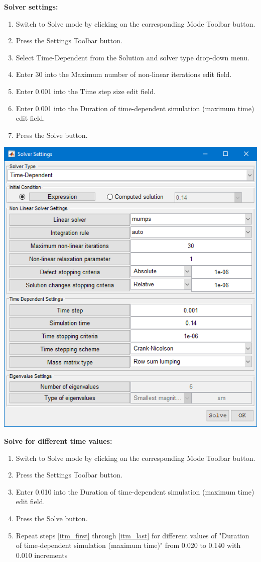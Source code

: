 \documentclass{article}
\begin{document}
\textbf{Solver settings:}
\begin{enumerate}[resume]
\item Switch to Solve mode by clicking on the corresponding Mode Toolbar button.
\item Press the Settings Toolbar button.
\item Select Time-Dependent from the Solution and solver type drop-down menu.
\item Enter  30  into the Maximum number of non-linear iterations edit field.
\item Enter  0.001  into the Time step size edit field.
\item Enter  0.001  into the Duration of time-dependent simulation (maximum time) edit field.
\item Press the Solve button.
\end{enumerate}

\begin{center}
\includegraphics[scale=0.60]{./matlab/FEATool_steps/solverSettings.png}
\end{center}

\textbf{Solve for different time values:}
\begin{enumerate}[resume]
\item \label{itm_first} Switch to Solve mode by clicking on the corresponding Mode Toolbar button.
\item Press the Settings Toolbar button.
\item Enter  0.010  into the Duration of time-dependent simulation (maximum time) edit field.
\item \label{itm_last} Press the Solve button.
\item[] Repeat steps \ref{itm_first} through \ref{itm_last} for different values of "Duration of time-dependent simulation (maximum time)" from 0.020 to 0.140 with 0.010 increments
\end{enumerate}
\end{document}
